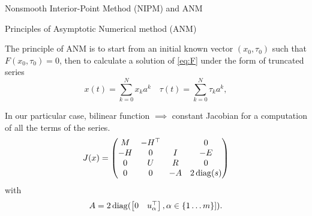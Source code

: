 \begin{frame}{Nonsmooth Interior-Point Method (NIPM) and ANM}
 \begin{block}{Principles of Asymptotic Numerical method (ANM)}
  
      The principle of ANM is to start from an initial known vector $(x_0,\tau_0)$ such that $F(x_0,\tau_0)=0$, then to calculate a solution of \eqref{eq:F} under the form of truncated series
      \begin{displaymath}
        x(t) = \sum_{k=0}^N x_k a^k \quad \tau(t) = \sum_{k=0}^N \tau_k a^k,
      \end{displaymath}
    
       In our particular case, bilinear function $\implies$ constant Jacobian for a computation of all the terms of the series.
      \begin{equation}
        \label{eq:23}
        J(x) =
        \begin{pmatrix}
          M &  -H^\top &   & 0\\
          -H & 0 & I & -E \\
          0 & U & R & 0 \\
          0 & 0 & -A & 2\, {\rm diag}(s) \\
        \end{pmatrix}
      \end{equation}
      with
      \begin{equation}
        \label{eq:22}
        A =2\, {\rm diag}(
        \begin{bmatrix} 0 & u_\alpha^\top
        \end{bmatrix}
        , \alpha \in \{1\ldots m\}]).
      \end{equation}
  \end{block}
\end{frame}

